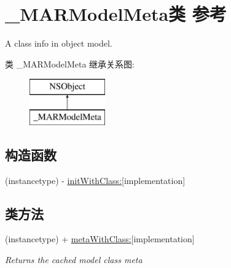 \hypertarget{interface___m_a_r_model_meta}{}\section{\+\_\+\+M\+A\+R\+Model\+Meta类 参考}
\label{interface___m_a_r_model_meta}


A class info in object model.  


类 \+\_\+\+M\+A\+R\+Model\+Meta 继承关系图\+:\begin{figure}[H]
\begin{center}
\leavevmode
\includegraphics[height=2.000000cm]{interface___m_a_r_model_meta}
\end{center}
\end{figure}
\subsection*{构造函数}
\begin{DoxyCompactItemize}
\item 
(instancetype) -\/ \hyperlink{interface___m_a_r_model_meta_a67ce54090c69f7372e1f1edf677589ec}{init\+With\+Class\+:}{\ttfamily  \mbox{[}implementation\mbox{]}}
\end{DoxyCompactItemize}
\subsection*{类方法}
\begin{DoxyCompactItemize}
\item 
(instancetype) + \hyperlink{interface___m_a_r_model_meta_a0f5be1bdc51aaf26ec0163b69b672b1e}{meta\+With\+Class\+:}{\ttfamily  \mbox{[}implementation\mbox{]}}
\begin{DoxyCompactList}\small\item\em Returns the cached model class meta \end{DoxyCompactList}\end{DoxyCompactItemize}
